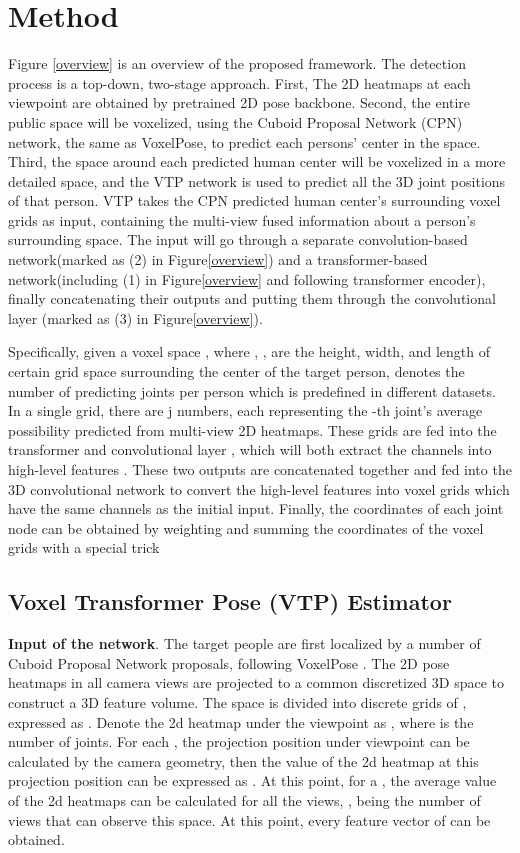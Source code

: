 \documentclass[lettersize,journal]{IEEEtran}
\begin{document}
\section{Method}
Figure \ref{overview} is an overview of the proposed framework.  The detection process is a top-down, two-stage approach. First, The 2D heatmaps at each viewpoint are obtained by  pretrained 2D pose backbone. Second, the entire public space will be voxelized, using the Cuboid Proposal Network (CPN) network, the same as VoxelPose\cite{tu2020voxelpose}, to predict each persons' center in the space. Third, the space around each predicted human center will be voxelized in a more detailed space, and the 
VTP network is used to predict all the 3D joint positions of that person.
VTP takes the CPN predicted human center's surrounding voxel grids as input, containing the multi-view fused information about a person’s surrounding space. The input will go through a separate convolution-based network(marked as (2) in Figure\ref{overview}) and a transformer-based network(including (1) in Figure\ref{overview} and following transformer encoder), finally concatenating their outputs and putting them through the convolutional layer (marked as (3) in Figure\ref{overview}).
\par Specifically, given a voxel space , where , ,  are the height, width, and length of certain grid space surrounding the center of the target person,  denotes the number of predicting joints per person which is predefined in different datasets. In a single grid, there are j numbers, each representing the -th joint’s average possibility predicted from multi-view 2D heatmaps. These grids are fed into the transformer  and convolutional layer , which will both extract the  channels into high-level features .  These two outputs are concatenated together and fed into the 3D convolutional network to convert the high-level features into voxel grids  which have the same channels as the initial input. Finally, the coordinates of each joint node can be obtained by weighting and summing the coordinates of the voxel grids with a special trick\cite{sun2018integral}
\subsection{Voxel Transformer Pose (VTP) Estimator}




\textbf{Input of the network}. The target people are first localized by a number of  Cuboid Proposal Network proposals, following VoxelPose \cite{tu2020voxelpose}. The 2D pose heatmaps in all camera views are projected to a common discretized 3D space to construct a 3D feature volume. The space is divided into discrete grids of , expressed as . Denote the 2d heatmap under the viewpoint  as , where  is the number of joints. For each , the projection position  under viewpoint  can be calculated by the camera geometry, then the value of the 2d heatmap at this projection position can be expressed as . At this point, for a , the average value of the 2d heatmaps can be calculated for all the views, ,  being the number of views that can observe this space. At this point, every feature vector of  can be obtained.
\end{document}
